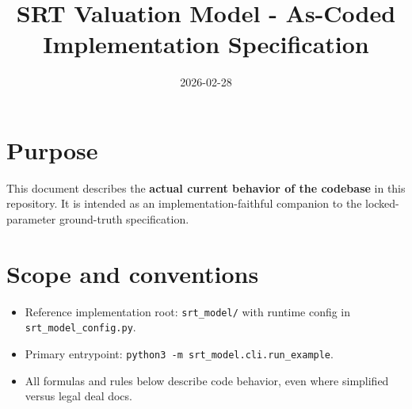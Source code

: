 \documentclass[11pt]{article}
\title{SRT Valuation Model - As-Coded Implementation Specification}
\date{2026-02-28}
\begin{document}
\maketitle

\section*{Purpose}
This document describes the \textbf{actual current behavior of the codebase} in this repository. It is intended as an implementation-faithful companion to the locked-parameter ground-truth specification.

\section*{Scope and conventions}
\begin{itemize}
  \item Reference implementation root: \texttt{srt\_model/} with runtime config in \texttt{srt\_model\_config.py}.
  \item Primary entrypoint: \texttt{python3 -m srt\_model.cli.run\_example}.
  \item All formulas and rules below describe code behavior, even where simplified versus legal deal docs.
\end{itemize}
\end{document}

